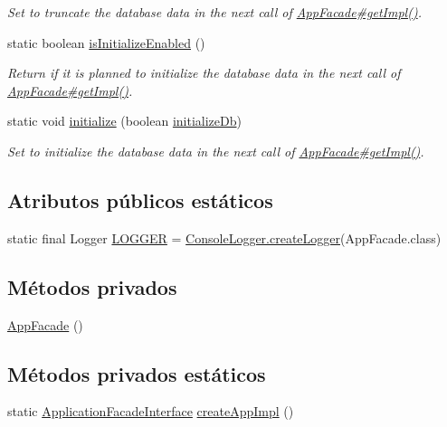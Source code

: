 \begin{DoxyCompactItemize}
\begin{DoxyCompactList}\small\item\em Set to truncate the database data in the next call of \mbox{\hyperlink{a00128_a029bcceee98b9070b9f80abc54db45d6}{App\+Facade\#get\+Impl()}}. \end{DoxyCompactList}\item 
static boolean \mbox{\hyperlink{a00128_a0486115e3ba238d025e23ec62548b3bc}{is\+Initialize\+Enabled}} ()
\begin{DoxyCompactList}\small\item\em Return if it is planned to initialize the database data in the next call of \mbox{\hyperlink{a00128_a029bcceee98b9070b9f80abc54db45d6}{App\+Facade\#get\+Impl()}}. \end{DoxyCompactList}\item 
static void \mbox{\hyperlink{a00128_a48252ec119a6bb16f5353df6ec6eff54}{initialize}} (boolean \mbox{\hyperlink{a00128_a08e1f188faabf8bef71610c49bdd5d84}{initialize\+Db}})
\begin{DoxyCompactList}\small\item\em Set to initialize the database data in the next call of \mbox{\hyperlink{a00128_a029bcceee98b9070b9f80abc54db45d6}{App\+Facade\#get\+Impl()}}. \end{DoxyCompactList}\end{DoxyCompactItemize}
\subsection*{Atributos públicos estáticos}
\begin{DoxyCompactItemize}
\item 
static final Logger \mbox{\hyperlink{a00128_a05d4beab693581eccd0ba740dc222f37}{L\+O\+G\+G\+ER}} = \mbox{\hyperlink{a00220_a520321643663e37d95761134a35505cd}{Console\+Logger.\+create\+Logger}}(App\+Facade.\+class)
\end{DoxyCompactItemize}
\subsection*{Métodos privados}
\begin{DoxyCompactItemize}
\item 
\mbox{\hyperlink{a00128_a06c4cf71ecdbda8e7abccdd21d84d549}{App\+Facade}} ()
\end{DoxyCompactItemize}
\subsection*{Métodos privados estáticos}
\begin{DoxyCompactItemize}
\item 
static \mbox{\hyperlink{a00136}{Application\+Facade\+Interface}} \mbox{\hyperlink{a00128_a8f4d396c7d2ce6ba084554d68385fc34}{create\+App\+Impl}} ()
\end{DoxyCompactItemize}
